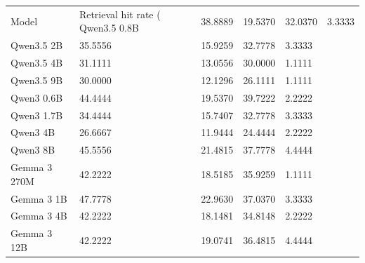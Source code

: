 \begin{tabular}{llrrl}
\toprule
Model & Retrieval hit rate (%
\midrule
Qwen3.5 0.8B & 38.8889 & 19.5370 & 32.0370 & 3.3333 \\
Qwen3.5 2B & 35.5556 & 15.9259 & 32.7778 & 3.3333 \\
Qwen3.5 4B & 31.1111 & 13.0556 & 30.0000 & 1.1111 \\
Qwen3.5 9B & 30.0000 & 12.1296 & 26.1111 & 1.1111 \\
Qwen3 0.6B & 44.4444 & 19.5370 & 39.7222 & 2.2222 \\
Qwen3 1.7B & 34.4444 & 15.7407 & 32.7778 & 3.3333 \\
Qwen3 4B & 26.6667 & 11.9444 & 24.4444 & 2.2222 \\
Qwen3 8B & 45.5556 & 21.4815 & 37.7778 & 4.4444 \\
Gemma 3 270M & 42.2222 & 18.5185 & 35.9259 & 1.1111 \\
Gemma 3 1B & 47.7778 & 22.9630 & 37.0370 & 3.3333 \\
Gemma 3 4B & 42.2222 & 18.1481 & 34.8148 & 2.2222 \\
Gemma 3 12B & 42.2222 & 19.0741 & 36.4815 & 4.4444 \\
\bottomrule
\end{tabular}
